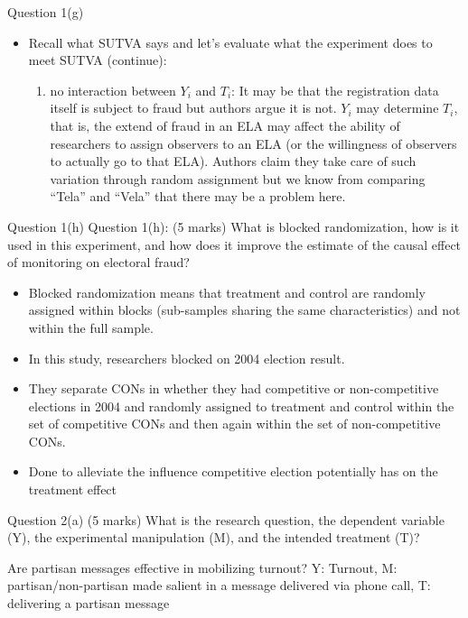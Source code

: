 \documentclass[xcolor=table,dvipsnames]{beamer}
\begin{document}
\begin{frame}{Question 1(g)}
\begin{itemize}
\item Recall what SUTVA says and let's evaluate what the experiment does to meet SUTVA (continue): \pause 
\begin{enumerate}
\item[5.] no interaction between $Y_i$ and $T_i$: \pause It may be that the registration data itself is subject to fraud but authors argue it is not. \pause $Y_i$ may determine $T_i$, that is, the extend of fraud in an ELA may affect the ability of researchers to assign observers to an ELA (or the willingness of observers to actually go to that ELA). \pause Authors claim they take care of such variation through random assignment but we know from comparing ``Tela'' and ``Vela'' that there may be a problem here. 
\end{enumerate}
\end{itemize}
\end{frame}


\begin{frame}{Question 1(h)}
Question 1(h): (5 marks) What is blocked randomization, how is it used in this experiment, and how does it improve the estimate of the causal effect of monitoring on electoral fraud?\pause
\begin{itemize}
\item Blocked randomization means that treatment and control are randomly assigned within blocks (sub-samples sharing the same characteristics) and not within the full sample. 
\item In this study, researchers blocked on 2004 election result.
\item They separate CONs in whether they had competitive or non-competitive elections in 2004 and randomly assigned to treatment and control within the set of competitive CONs and then again within the set of non-competitive CONs. 
\item Done to alleviate the influence competitive election potentially has on the treatment effect
\end{itemize}
\end{frame}

\begin{frame}{Question 2(a)}
(5 marks) What is the research question, the dependent variable (Y), the experimental manipulation (M), and the intended treatment (T)? \pause

Are partisan messages effective in mobilizing turnout? \pause Y: Turnout, M: partisan/non-partisan made salient in a message delivered via phone call, T: delivering a partisan message
\end{frame}
\end{document}
